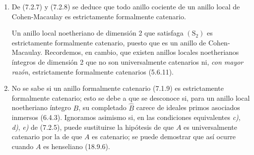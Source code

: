 \begin{remarks}[7.2.10]
\label{IV.2.s7.2.10-fr}
\begin{enumerate}
\item[(i)] De (7.2.7) y (7.2.8) se deduce que todo anillo cociente de
un anillo local de Cohen-Macaulay es estrictamente formalmente
catenario.

Un anillo local noetheriano de dimensión 2 que satisfaga
$(\mathrm S_2)$ es estrictamente formalmente catenario, puesto que es
un anillo de Cohen-Macaulay. Recordemos, en cambio, que existen
anillos locales noetherianos íntegros de dimensión 2 que no son
universalmente catenarios ni, \emph{con mayor razón}, estrictamente
formalmente catenarios (5.6.11).
\item[(ii)] No se sabe si un anillo formalmente catenario (7.1.9) es
estrictamente formalmente catenario; esto se debe a que se desconoce
si, para un anillo local noetheriano íntegro $B$, su completado
$\widehat B$ carece de ideales primos asociados inmersos (6.4.3).
Ignoramos asimismo si, en las condiciones equivalentes \emph{c)}, \emph{d)}, \emph{e)} de
(7.2.5), puede sustituirse la hipótesis de que $A$ es universalmente
catenario por la de que $A$ es catenario; se puede demostrar que así
ocurre cuando $A$ es henseliano (18.9.6).
\end{enumerate}
\end{remarks}

